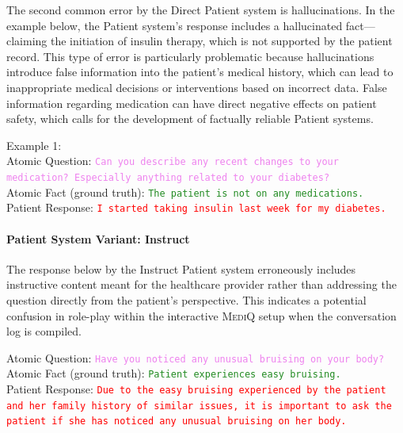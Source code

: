 The second common error by the Direct Patient system is hallucinations. In the example below, the Patient system's response includes a hallucinated fact—claiming the initiation of insulin therapy, which is not supported by the patient record. This type of error is particularly problematic because hallucinations introduce false information into the patient's medical history, which can lead to inappropriate medical decisions or interventions based on incorrect data. False information regarding medication can have direct negative effects on patient safety, which calls for the development of factually reliable Patient systems.

\begin{tcolorbox}[colframe=red]
\small
Example 1:\\
Atomic Question: \texttt{\textcolor{violet}{Can you describe any recent changes to your medication? Especially anything related to your diabetes?}}\\
Atomic Fact (ground truth): \texttt{\textcolor{forestgreen}{The patient is not on any medications.}}\\
Patient Response: \texttt{\textcolor{red}{I started taking insulin last week for my diabetes.}}
\normalsize
\end{tcolorbox}

\paragraph{Patient System Variant: Instruct}
The response below by the Instruct Patient system erroneously includes instructive content meant for the healthcare provider rather than addressing the question directly from the patient’s perspective. This indicates a potential confusion in role-play within the interactive \textsc{MediQ} setup when the conversation log is compiled.

\begin{tcolorbox}[colframe=red]
\small
Atomic Question: \texttt{\textcolor{violet}{Have you noticed any unusual bruising on your body?}}\\
Atomic Fact (ground truth): \texttt{\textcolor{forestgreen}{Patient experiences easy bruising.}}\\
Patient Response: \texttt{\textcolor{red}{Due to the easy bruising experienced by the patient and her family history of similar issues, it is important to ask the patient if she has noticed any unusual bruising on her body.}}
\normalsize
\end{tcolorbox}








